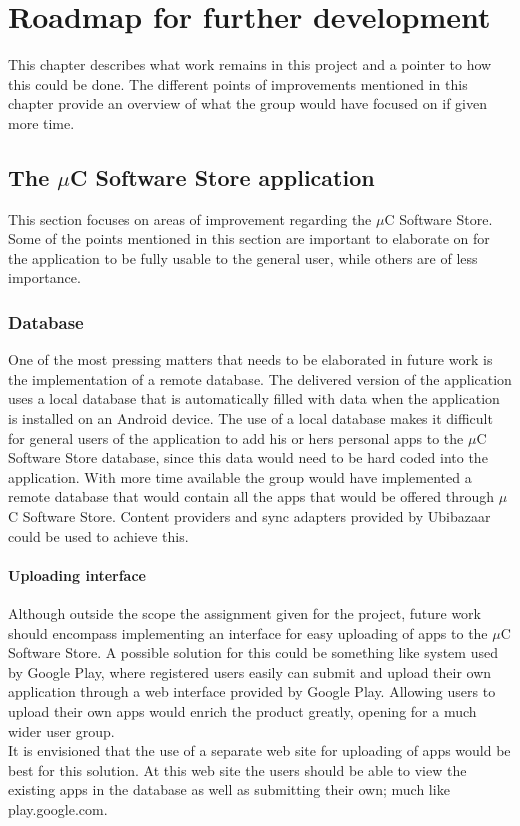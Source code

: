 \chapter{Roadmap for further development}
This chapter describes what work remains in this project and a pointer to how this could be done. The different points of improvements mentioned in this chapter provide an overview of what the group would have focused on if given more time.

\section{The $\mu$C Software Store application}
This section focuses on areas of improvement regarding the $\mu$C Software Store. Some of the points mentioned in this section are important to elaborate on for the application to be fully usable to the general user, while others are of less importance.

	\subsection{Database}
	One of the most pressing matters that needs to be elaborated in future work is the implementation of a remote database. The delivered version of the application uses a local database that is automatically filled with data when the application is installed on an Android device. The use of a local database makes it difficult for general users of the application to add his or hers personal apps to the $\mu$C Software Store database, since this data would need to be hard coded into the application. With more time available the group would have implemented a remote database that would contain all the apps that would be offered through $\mu$C Software Store. Content providers and sync adapters provided by Ubibazaar could be used to achieve this.

	\subsubsection{Uploading interface}
	Although outside the scope the assignment given for the project, future work should encompass implementing an interface for easy uploading of apps to the $\mu$C Software Store. A possible solution for this could be something like system used by Google Play, where registered users easily can submit and upload their own application through a web interface provided by Google Play. Allowing users to upload their own apps would enrich the product greatly, opening for a much wider user group.\\
	\newline
	It is envisioned that the use of a separate web site for uploading of apps would be best for this solution. At this web site the users should be able to view the existing apps in the database as well as submitting their own; much like play.google.com.

